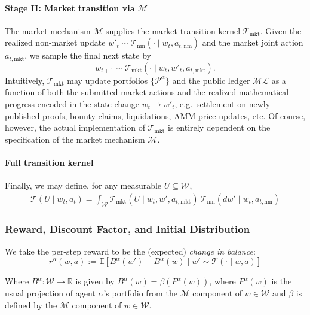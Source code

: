 \paragraph{Stage II: Market transition via $\mathscr{M}$}

The market mechanism $\mathscr{M}$ supplies the market transition kernel $\mathcal{T}_{\mathrm{mkt}}$.
Given the realized non-market update $w'_t \sim \mathcal{T}_\mathrm{nm}(\cdot \mid w_t, a_{t,\mathrm{nm}})$ and the market joint action $a_{t,\mathrm{mkt}}$,
we sample the final next state by
\[
w_{t+1}\sim \mathcal{T}_{\mathrm{mkt}}(\cdot\mid w_t,w'_t,a_{t,\mathrm{mkt}}).
\]
Intuitively, $\mathcal{T}_{\mathrm{mkt}}$ may update portfolios $\{\mathcal{P}^\alpha\}$ and the public ledger $\mathcal{ML}$
as a function of both the submitted market actions and the realized mathematical progress encoded in the state change $w_t\to w'_t$,
e.g.\ settlement on newly published proofs, bounty claims, liquidations, AMM price updates, etc. Of course, however, the actual implementation of $\mathcal{T}_\mathrm{mkt}$ is entirely dependent on the specification of the market mechanism $\mathscr{M}$.

\paragraph{Full transition kernel}


Finally, we may define, for any measurable $U\subseteq\mathcal{W}$,
\begin{align*}
\mathcal{T}(U\mid w_t,a_t) = \int_{\mathcal{W}}
\mathcal{T}_{\mathrm{mkt}}(U\mid w_t,w',a_{t,\mathrm{mkt}})
\ \mathcal{T}_{\mathrm{nm}}(dw'\mid w_t,a_{t,\mathrm{nm}})
\end{align*}



\subsubsection{Reward, Discount Factor, and Initial Distribution}

We take the per-step reward to be the (expected) \emph{change in balance}:
\[
r^\alpha(w,a) := \mathbb{E}[B^\alpha(w') - B^\alpha(w) \mid w' \sim \mathcal T(\cdot \mid w,a)]
\]

Where $B^\alpha : \mathcal{W} \to \mathbb{R}$ is given by $B^\alpha(w) = \beta(P^\alpha(w))$, where $P^\alpha(w)$ is the usual projection of agent $\alpha$'s portfolio from the $\mathcal{M}$ component of $w \in \mathcal{W}$ and $\beta$ is defined by the $\mathscr{M}$ component of $w \in \mathcal{W}$.

